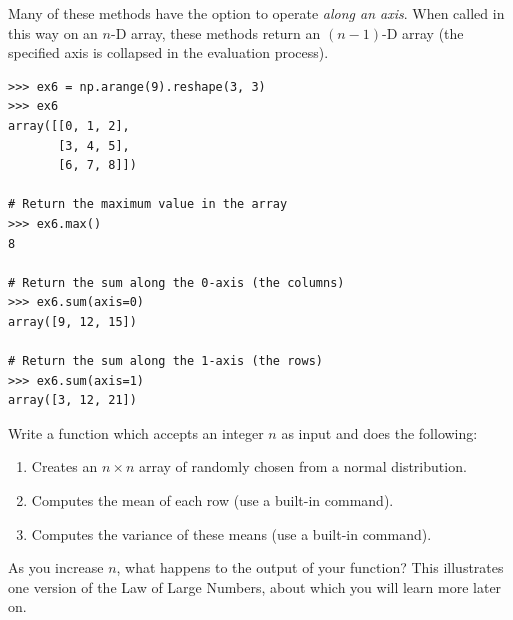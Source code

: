 Many of these methods have the option to operate \emph{along an axis}. 
When called in this way on an $n$-D array, these methods return an $(n-1)$-D array (the specified axis is collapsed in the evaluation process).

\begin{lstlisting}
>>> ex6 = np.arange(9).reshape(3, 3)
>>> ex6
array([[0, 1, 2],
       [3, 4, 5],
       [6, 7, 8]])
       
# Return the maximum value in the array
>>> ex6.max() 
8

# Return the sum along the 0-axis (the columns)
>>> ex6.sum(axis=0)
array([9, 12, 15])

# Return the sum along the 1-axis (the rows)
>>> ex6.sum(axis=1)
array([3, 12, 21])
\end{lstlisting}


\begin{problem}
Write a function which accepts an integer $n$ as input and does the following:
\begin{enumerate}
\item Creates an $n\times n$ array of  randomly chosen from a normal distribution.
\item Computes the mean of each row (use a built-in command).
\item Computes the variance of these means (use a built-in command).
\end{enumerate}
As you increase $n$, what happens to the output of 
your function? This illustrates one version of
the Law of Large Numbers, about which you will learn more later on.
\end{problem}

